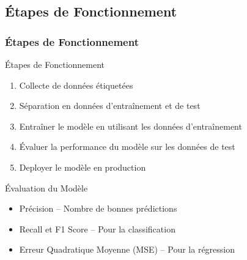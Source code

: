 \documentclass[11pt]{beamer}
\begin{document}
\subsection[Étapes de Fonctionnement]{Étapes de Fonctionnement}
\begin{frame}
	\frametitle{Étapes de Fonctionnement}
	\begin{block}{Étapes de Fonctionnement}
		\begin{enumerate}
			\item Collecte de données étiquetées
			\pause
			\item Séparation en données d'entraînement et de test
			\pause
			\item Entraîner le modèle en utilisant les données d'entraînement
			\pause
			\item Évaluer la performance du modèle sur les données de test
			\pause
			\item Deployer le modèle en production
		\end{enumerate}
	\end{block}
	\begin{block}{Évaluation du Modèle}
		\begin{itemize}
			\item Précision – Nombre de bonnes prédictions
			\item Recall et F1 Score – Pour la classification
			\item Erreur Quadratique Moyenne (MSE) – Pour la régression
		\end{itemize}
	\end{block}
\end{frame}
\end{document}
